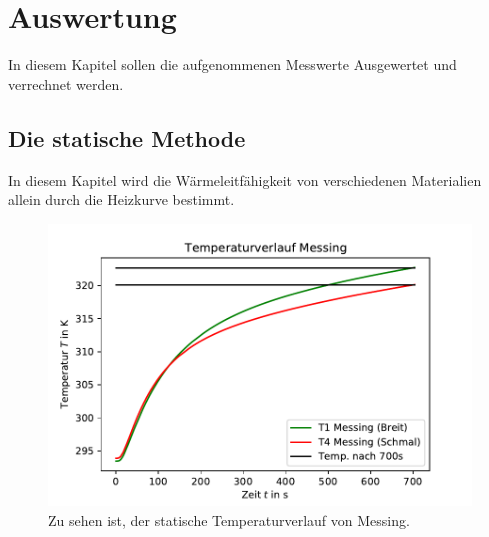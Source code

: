 \section{Auswertung}
In diesem Kapitel sollen die aufgenommenen Messwerte Ausgewertet und verrechnet werden.
\subsection{Die statische Methode}
\label{sec:auswertung1}
In diesem Kapitel wird die Wärmeleitfähigkeit von verschiedenen Materialien allein durch die Heizkurve bestimmt.

\begin{figure}
    \centering
    \includegraphics{statmessing.pdf}
    \caption{Zu sehen ist, der statische Temperaturverlauf von Messing.}
    \label{fig:statmess}
  \end{figure}


